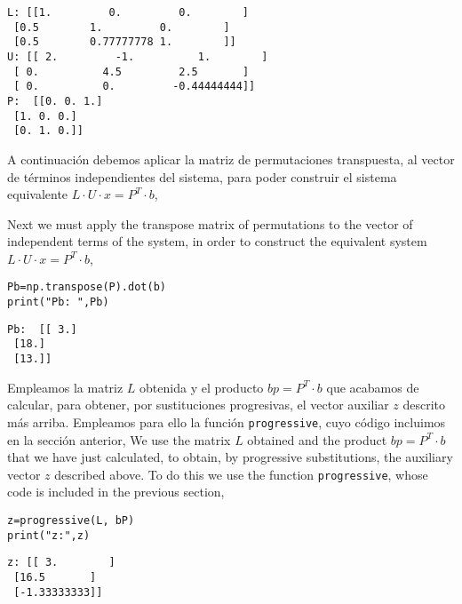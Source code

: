 \begin{verbatim}
L: [[1.         0.         0.        ]
 [0.5        1.         0.        ]
 [0.5        0.77777778 1.        ]]
U: [[ 2.         -1.          1.        ]
 [ 0.          4.5         2.5       ]
 [ 0.          0.         -0.44444444]]
P:  [[0. 0. 1.]
 [1. 0. 0.]
 [0. 1. 0.]]
\end{verbatim}

\begin{paracol}{2}
A continuación debemos aplicar la matriz de permutaciones transpuesta, al vector de términos independientes del sistema, para poder construir el sistema equivalente $L\cdot U \cdot x=P^T\cdot b$,

\switchcolumn
Next we must apply the transpose matrix of permutations to the vector of independent terms of the system, in order to construct the equivalent system $L\cdot U \cdot x= P^T\cdot b$,

\end{paracol}

\begin{verbatim}
Pb=np.transpose(P).dot(b)
print("Pb: ",Pb)
\end{verbatim}

\begin{verbatim}
Pb:  [[ 3.]
 [18.]
 [13.]]  
\end{verbatim}

\begin{paracol}{2}

Empleamos la matriz $L$ obtenida y el producto $bp=P^T\cdot b$ que acabamos de calcular, para obtener, por sustituciones progresivas, el vector auxiliar $z$ descrito más arriba. Empleamos para ello la función \texttt{progressive}, cuyo código incluimos en la sección anterior, 
\switchcolumn
We use the matrix $L$ obtained and the product $bp=P^T\cdot b$ that we have just calculated, to obtain, by progressive substitutions, the auxiliary vector $z$ described above. To do this we use the function \texttt{progressive}, whose code is included in the previous section, 
\end{paracol}

\begin{verbatim}
z=progressive(L, bP)
print("z:",z)    
\end{verbatim}

\begin{verbatim}
z: [[ 3.        ]
 [16.5       ]
 [-1.33333333]]  
\end{verbatim}

